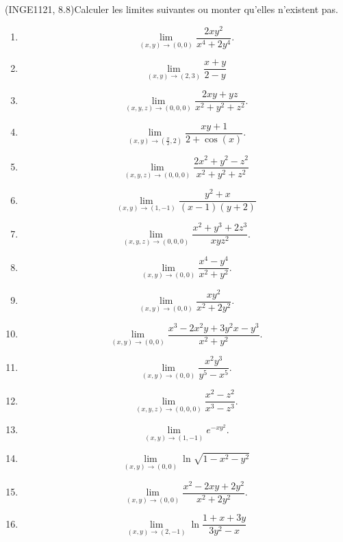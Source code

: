 

\begin{exercice}\label{exoFoncDeuxVar0018}

	(INGE1121, 8.8)Calculer les limites suivantes ou monter qu'elles n'existent pas.
	\begin{multicols}{2}
		\begin{enumerate}
			
			\item %
				\[ 
					\lim_{(x,y)\to(0,0)}\frac{ 2xy^2 }{ x^4+2y^4 }.
				\]
			\item %
				\[ 
					\lim_{(x,y)\to(2,3)}\frac{ x+y }{ 2-y }	
				\]
			\item	%
				\[ 
					\lim_{(x,y,z)\to(0,0,0)}\frac{ 2xy+yz }{ x^2+y^2+z^2 }.	
				\]
			\item	%
				\[ 
					\lim_{(x,y)\to(\frac{ \pi }{2},2)}\frac{ xy+1 }{ 2+\cos(x) }.
				\]
			\item	%
				\[ 
					\lim_{(x,y,z)\to(0,0,0)}\frac{ 2x^2+y^2-z^2 }{ x^2+y^2+z^2 }
				\]
			\item	%
				\[ 
					\lim_{(x,y)\to(1,-1)}\frac{ y^2+x }{ (x-1)(y+2) }
				\]
			\item	%
				\[ 
					\lim_{(x,y,z)\to(0,0,0)}\frac{ x^2+y^3+2z^3 }{ xyz^2 }.
				\]
			\item	%
				\[ 
					\lim_{(x,y)\to(0,0)}\frac{ x^4-y^4 }{ x^2+y^2 }.
				\]
			\item	%
				\[ 
					\lim_{(x,y)\to(0,0)}\frac{ xy^2 }{ x^2+2y^2 }.
				\]
			\item	%
				\[ 
					\lim_{(x,y)\to(0,0)}\frac{ x^3-2x^2y+3y^2x-y^3 }{ x^2+y^2 }.
				\]
			\item	%
				\[ 
				\lim_{(x,y)\to(0,0)}\frac{ x^2y^3 }{ y^5-x^5 }.
				\]
			\item	%
				\[ 
				\lim_{(x,y,z)\to(0,0,0)}\frac{ x^2-z^2 }{ x^3-z^3 }.
				\]
			\item	%
				\[ 
					\lim_{(x,y)\to(1,-1)} e^{-xy^2}.
				\]
			\item	%
				\[ 
					\lim_{(x,y)\to(0,0)}\ln\sqrt{1-x^2-y^2}
				\]
			\item	%
				\[ 
					\lim_{(x,y)\to(0,0)}\frac{ x^2-2xy+2y^2 }{ x^2+2y^2 }.
				\]
			\item %
				\[ 
					\lim_{(x,y)\to(2,-1)}\ln\frac{ 1+x+3y }{ 3y^2-x }
				\]
					

\end{enumerate}
\end{multicols}
\end{exercice}
